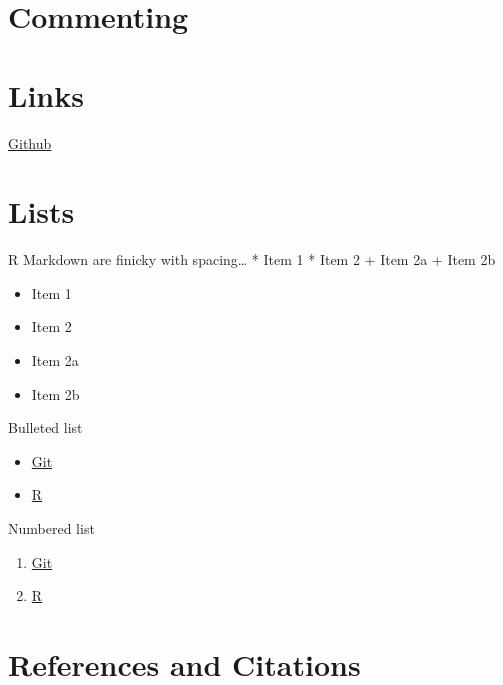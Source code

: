 \documentclass[12pt,]{article}
\begin{document}
\section{Commenting}\label{commenting}

\section{Links}\label{links}

\href{www.github.com}{Github}

\section{Lists}\label{lists}

R Markdown are finicky with spacing\ldots{} * Item 1 * Item 2 + Item 2a
+ Item 2b

\begin{itemize}
\itemsep1pt\parskip0pt
\item
  Item 1
\item
  Item 2
\item
  Item 2a
\item
  Item 2b
\end{itemize}

Bulleted list

\begin{itemize}[noitemsep,nolistsep,topsep=0pt]

\item \href{https://git-scm.com/book/en/v2/Getting-Started-Installing-Git}{Git}

\item \href{https://cran.r-project.org/bin/windows/base/}{R}

\end{itemize}

Numbered list

\begin{enumerate}[noitemsep,nolistsep,topsep=0pt]

\item \href{https://git-scm.com/book/en/v2/Getting-Started-Installing-Git}{Git}

\item \href{https://cran.r-project.org/bin/windows/base/}{R} 

\end{enumerate}

\section{References and Citations}\label{references-and-citations}
\end{document}
